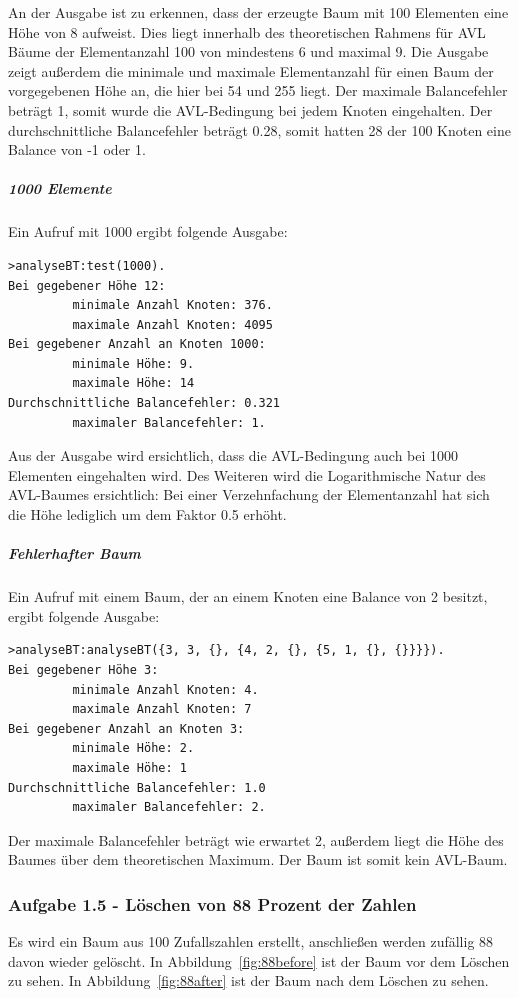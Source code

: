 An der Ausgabe ist zu erkennen, dass der erzeugte Baum mit 100 Elementen eine Höhe von 8
aufweist.
Dies liegt innerhalb des theoretischen Rahmens für AVL Bäume der Elementanzahl 100 von mindestens
6 und maximal 9.
Die Ausgabe zeigt außerdem die minimale und maximale Elementanzahl für einen Baum der
vorgegebenen Höhe an, die hier bei 54 und 255 liegt.
Der maximale Balancefehler beträgt 1, somit wurde die AVL-Bedingung bei jedem Knoten eingehalten.
Der durchschnittliche Balancefehler beträgt 0.28, somit hatten 28 der 100 Knoten eine Balance
von -1 oder 1.

\subparagraph{1000 Elemente}
Ein Aufruf mit 1000 ergibt folgende Ausgabe:
\begin{verbatim}
>analyseBT:test(1000).
Bei gegebener Höhe 12:
         minimale Anzahl Knoten: 376.
         maximale Anzahl Knoten: 4095
Bei gegebener Anzahl an Knoten 1000:
         minimale Höhe: 9.
         maximale Höhe: 14
Durchschnittliche Balancefehler: 0.321
         maximaler Balancefehler: 1.
\end{verbatim}

Aus der Ausgabe wird ersichtlich, dass die AVL-Bedingung auch bei 1000 Elementen eingehalten wird.
Des Weiteren wird die Logarithmische Natur des AVL-Baumes ersichtlich:
Bei einer Verzehnfachung der Elementanzahl hat sich die Höhe lediglich um dem Faktor 0.5 erhöht.

\subparagraph{Fehlerhafter Baum}
Ein Aufruf mit einem Baum, der an einem Knoten eine Balance von 2 besitzt, ergibt folgende Ausgabe:
\begin{verbatim}
>analyseBT:analyseBT({3, 3, {}, {4, 2, {}, {5, 1, {}, {}}}}).
Bei gegebener Höhe 3:
         minimale Anzahl Knoten: 4.
         maximale Anzahl Knoten: 7
Bei gegebener Anzahl an Knoten 3:
         minimale Höhe: 2.
         maximale Höhe: 1
Durchschnittliche Balancefehler: 1.0
         maximaler Balancefehler: 2.
\end{verbatim}
Der maximale Balancefehler beträgt wie erwartet 2, außerdem liegt die Höhe des Baumes über dem
theoretischen Maximum.
Der Baum ist somit kein AVL-Baum.

\subsubsection{Aufgabe 1.5 - Löschen von 88 Prozent der Zahlen}
Es wird ein Baum aus 100 Zufallszahlen erstellt, anschließen werden zufällig 88 davon wieder
gelöscht.
In Abbildung~\ref{fig:88before} ist der Baum vor dem Löschen zu sehen.
In Abbildung~\ref{fig:88after} ist der Baum nach dem Löschen zu sehen.

